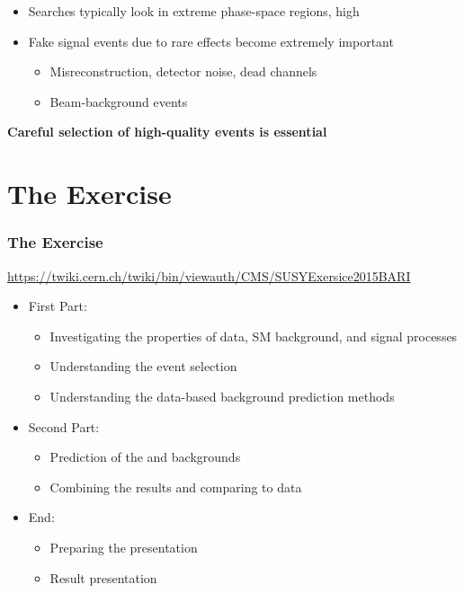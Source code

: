 \documentclass{beamer}
\begin{document}
\begin{frame}
\begin{itemize}
  \item Searches typically look in extreme phase-space regions, \eg high \MHT
  \item Fake signal events due to rare effects become extremely important
    \begin{itemize}
    \item Misreconstruction, detector noise, dead channels
    \item Beam-background events
    \end{itemize}
  \end{itemize}
  \begin{block}{}
    \center
    \textbf{Careful selection of high-quality events is essential}
  \end{block}
\end{frame}

\section{The Exercise}
\begin{frame}[t]
  \frametitle{The Exercise}
  \url{https://twiki.cern.ch/twiki/bin/viewauth/CMS/SUSYExersice2015BARI}
  \vskip0.5cm
  \begin{itemize}
  \item First Part:
    \begin{itemize}
    \item Investigating the properties of data, SM background, and signal processes
    \item Understanding the event selection
    \item Understanding the data-based background prediction methods
    \end{itemize}
  \item Second Part:
  \begin{itemize}
    \item Prediction of the \wpj and \ttbar backgrounds
    \item Combining the results and comparing to data
    \end{itemize}
    \item End:
    \begin{itemize}
    \item Preparing the presentation
    \item Result presentation
    \end{itemize}
  \end{itemize}
\end{frame}





\end{document}
